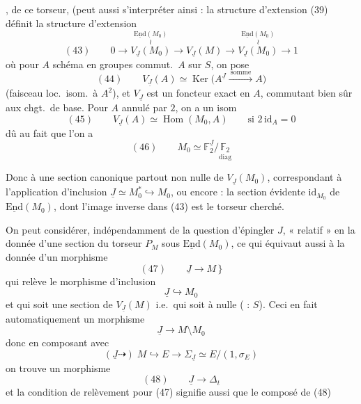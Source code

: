 \documentclass[11pt,a4paper]{article}
\begin{document}
 , de ce torseur,
 (peut aussi s'interpréter ainsi : la structure d'extension (39)
 définit la structure d'extension
\[
  (43) \qquad 0 \to
  \overset{\underline{\mathrm{End}}(M_0)}{\overset{\wr}{V_{\underline{J}}(M_0)}}
  \longrightarrow V_{\underline{J}}(M) \longrightarrow
  \overset{\underline{\mathrm{End}}(M_0)}{\overset{\wr}{V_{\underline{J}}(M_0)}}
  \longrightarrow 1
\]
où pour $A$ schéma  en groupes commut.\ $A$ sur $S$, on
pose
\[
  (44) \qquad V_{\underline{J}}(A) \simeq
  \operatorname{Ker}\bigl( A^{\underline{J}} \xrightarrow{\ \text{somme}\ } A \bigr)
\]
(faisceau loc.\ isom.\ à $A^2$), et $V_{\underline{J}}$ est un foncteur exact
en $A$, commutant \ill{} bien sûr aux chgt.\ de base. Pour $A$ annulé par
$2$, on a un isom
\[
  (45) \qquad V_{\underline{J}}(A) \simeq \operatorname{Hom}(M_0, A)
  \qquad \text{si } 2\,\mathrm{id}_A = 0
\]
dû au fait que l'on a
\[
  (46) \qquad M_0 \simeq \mathbb{F}_2^{\underline{J}} / \underset{\text{diag}}{\mathbb{F}_2}
\]

Donc à une section  canonique partout non nulle de
$V_{\underline{J}}(M_0)$, correspondant à l'application d'inclusion
$\underline{J} \simeq M_0^* \hookrightarrow M_0$, ou encore : la section
évidente $\mathrm{id}_{M_0}$ de $\underline{\mathrm{End}}(M_0)$, dont l'image
inverse dans (43) est le torseur cherché.


On peut considérer, indépendamment de la question d'épingler $J$,
  \struck{\ill{}} « relatif »
  en  la donnée
d'une section du torseur $P_M$  sous
$\underline{\mathrm{End}}(M_0)$, ce qui équivaut aussi à la donnée d'un
morphisme
\[
  (47) \qquad \underline{J} \longrightarrow M \,\}
\]
qui relève le morphisme d'inclusion
\[
  \underline{J} \hookrightarrow M_0
\]
et qui soit une section de $V_{\underline{J}}(M)$ i.e.\ qui soit à
 nulle (\ill{} : $S$). Ceci en fait automatiquement un
morphisme
\[
  \underline{J} \longrightarrow M \setminus M_0
\]
donc en composant avec 
\[
  (\underline{J} \dashrightarrow)\; M \hookrightarrow E \longrightarrow
  \Sigma_{\underline{J}} \simeq E/(1, \sigma_E)
\]
on trouve un morphisme
\[
  (48) \qquad \underline{J} \longrightarrow \Delta_t
\]
et la condition de relèvement pour (47) signifie aussi que le composé de (48)
\end{document}
